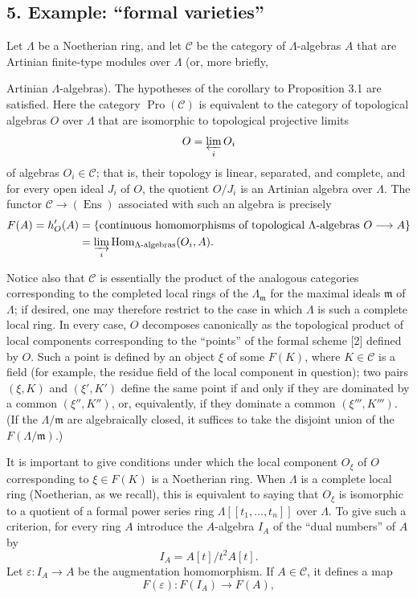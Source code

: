 \subsection*{5. Example: “formal varieties”}

Let $\Lambda$ be a Noetherian ring, and let $\mathcal C$ be the category of
$\Lambda$-algebras $A$ that are Artinian finite-type modules over $\Lambda$
(or, more briefly,

Artinian $\Lambda$-algebras). The hypotheses of the corollary to Proposition
3.1 are satisfied. Here the category $\operatorname{Pro}(\mathcal C)$ is
equivalent to the category of topological algebras $O$ over $\Lambda$ that are
isomorphic to topological projective limits
\[
  O=\varprojlim_i O_i
\]
of algebras $O_i\in\mathcal C$; that is, their topology is linear, separated,
and complete, and for every open ideal $J_i$ of $O$, the quotient $O/J_i$ is
an Artinian algebra over $\Lambda$. The functor
$\mathcal C\longrightarrow(\operatorname{Ens})$ associated with such an
algebra is precisely
\begin{align*}
  F(A)=h'_O(A)
  &=\{\text{continuous homomorphisms of topological $\Lambda$-algebras }
       O\longrightarrow A\}\\
  &=\varinjlim_i
    \operatorname{Hom}_{\Lambda\text{-algebras}}(O_i,A).
\end{align*}

Notice also that $\mathcal C$ is essentially the product of the analogous
categories corresponding to the completed local rings of the
$\Lambda_{\mathfrak m}$ for the maximal ideals $\mathfrak m$ of $\Lambda$; if
desired, one may therefore restrict to the case in which $\Lambda$ is such a
complete local ring. In every case, $O$ decomposes canonically as the
topological product of local components corresponding to the “points” of the
formal scheme [2] defined by $O$. Such a point is defined by an object $\xi$
of some $F(K)$, where $K\in\mathcal C$ is a field (for example, the residue
field of the local component in question); two pairs $(\xi,K)$ and
$(\xi',K')$ define the same point if and only if they are dominated by a common
$(\xi'',K'')$, or, equivalently, if they dominate a common
$(\xi''',K''')$. (If the $\Lambda/\mathfrak m$ are algebraically closed, it
suffices to take the disjoint union of the $F(\Lambda/\mathfrak m)$.)

It is important to give conditions under which the local component $O_\xi$ of
$O$ corresponding to $\xi\in F(K)$ is a Noetherian ring. When $\Lambda$ is a
complete local ring (Noetherian, as we recall), this is equivalent to saying
that $O_\xi$ is isomorphic to a quotient of a formal power series ring
$\Lambda[[t_1,\ldots,t_n]]$ over $\Lambda$. To give such a criterion, for
every ring $A$ introduce the $A$-algebra $I_A$ of the “dual numbers” of $A$ by
\[
  I_A=A[t]/t^2A[t].
\]
Let $\varepsilon:I_A\longrightarrow A$ be the augmentation homomorphism. If
$A\in\mathcal C$, it defines a map
\[
  F(\varepsilon):F(I_A)\longrightarrow F(A),
\]

